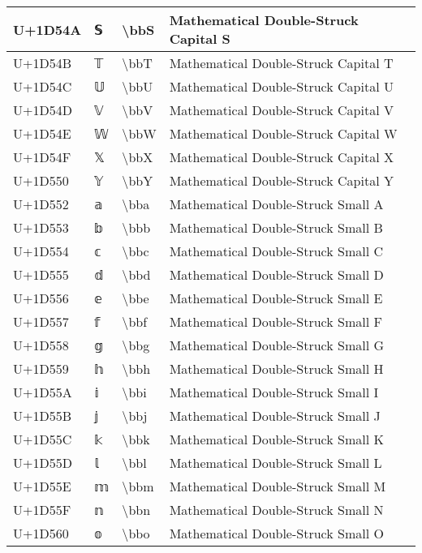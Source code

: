 \begin{table}[h]
\begin{tabulary}{\linewidth}{|L|L|L|L|}
\hline
U+1D54A & 𝕊 & {\textbackslash}bbS & Mathematical Double-Struck Capital S \\
\hline
U+1D54B & 𝕋 & {\textbackslash}bbT & Mathematical Double-Struck Capital T \\
\hline
U+1D54C & 𝕌 & {\textbackslash}bbU & Mathematical Double-Struck Capital U \\
\hline
U+1D54D & 𝕍 & {\textbackslash}bbV & Mathematical Double-Struck Capital V \\
\hline
U+1D54E & 𝕎 & {\textbackslash}bbW & Mathematical Double-Struck Capital W \\
\hline
U+1D54F & 𝕏 & {\textbackslash}bbX & Mathematical Double-Struck Capital X \\
\hline
U+1D550 & 𝕐 & {\textbackslash}bbY & Mathematical Double-Struck Capital Y \\
\hline
U+1D552 & 𝕒 & {\textbackslash}bba & Mathematical Double-Struck Small A \\
\hline
U+1D553 & 𝕓 & {\textbackslash}bbb & Mathematical Double-Struck Small B \\
\hline
U+1D554 & 𝕔 & {\textbackslash}bbc & Mathematical Double-Struck Small C \\
\hline
U+1D555 & 𝕕 & {\textbackslash}bbd & Mathematical Double-Struck Small D \\
\hline
U+1D556 & 𝕖 & {\textbackslash}bbe & Mathematical Double-Struck Small E \\
\hline
U+1D557 & 𝕗 & {\textbackslash}bbf & Mathematical Double-Struck Small F \\
\hline
U+1D558 & 𝕘 & {\textbackslash}bbg & Mathematical Double-Struck Small G \\
\hline
U+1D559 & 𝕙 & {\textbackslash}bbh & Mathematical Double-Struck Small H \\
\hline
U+1D55A & 𝕚 & {\textbackslash}bbi & Mathematical Double-Struck Small I \\
\hline
U+1D55B & 𝕛 & {\textbackslash}bbj & Mathematical Double-Struck Small J \\
\hline
U+1D55C & 𝕜 & {\textbackslash}bbk & Mathematical Double-Struck Small K \\
\hline
U+1D55D & 𝕝 & {\textbackslash}bbl & Mathematical Double-Struck Small L \\
\hline
U+1D55E & 𝕞 & {\textbackslash}bbm & Mathematical Double-Struck Small M \\
\hline
U+1D55F & 𝕟 & {\textbackslash}bbn & Mathematical Double-Struck Small N \\
\hline
U+1D560 & 𝕠 & {\textbackslash}bbo & Mathematical Double-Struck Small O \\

\end{tabulary}
\end{table}
